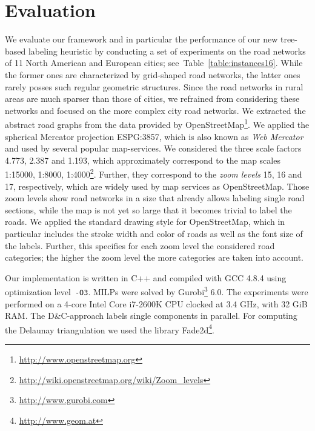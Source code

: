 \documentclass[a4paper,11pt]{article}
\newcommand{\Shredder}{\textsc{D\&C}}
\begin{document}
\section{Evaluation}\label{sec:evaluation}






We evaluate our framework and in particular the performance of our new tree-based labeling heuristic by conducting a set of experiments on the road networks of 11 North American and European cities; see~Table~\ref{table:instances16}.
While the former ones are characterized by
grid-shaped road networks, the latter ones rarely posses such
regular geometric structures. 
Since the road networks in rural areas are
much sparser than those of cities, we refrained from considering these networks and focused on the more complex city road networks.  
We extracted the abstract road graphs from the data provided by
OpenStreetMap\footnote{\url{http://www.openstreetmap.org}}. We applied the spherical
Mercator projection ESPG:3857, which is also known as \emph{Web
  Mercator} and used by several popular map-services.  We considered
the three scale factors 4.773, 2.387 and 1.193, which approximately
correspond to the map scales 1:15000, 1:8000, 1:4000\footnote{\url{http://wiki.openstreetmap.org/wiki/Zoom\_levels}}. Further, they correspond to the
\emph{zoom levels} 15, 16 and 17, respectively, which are widely used
by map services as OpenStreetMap. Those zoom levels show road networks
in a size that already allows labeling single road sections, while the
map is not yet so large that it becomes trivial to label the
roads. We applied the standard drawing style for OpenStreetMap, which
in particular includes the stroke width and color of roads as well
as the font size of the labels. Further, this specifies for each zoom
level the considered road categories; the higher the zoom level the
more categories are taken into account.














Our implementation is written in C++ and compiled with GCC 4.8.4 using
optimization level~\texttt{-O3}. MILPs were solved by
Gurobi\footnote{\url{http://www.gurobi.com}} 6.0. The experiments were performed on a 4-core
Intel Core i7-2600K CPU clocked at 3.4 GHz, with 32 GiB RAM. The
\Shredder-approach labels single components in parallel. For computing
the Delaunay triangulation we used the library
Fade2d\footnote{\url{http://www.geom.at}}.
\end{document}
